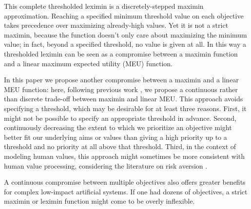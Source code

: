 This complete thresholded leximin is a discretely-stepped maximin approximation. Reaching a specified minimum threshold value on each objective takes precedence over maximizing already-high values. Yet it is not a strict maximin, because the function doesn't only care about maximizing the minimum value; in fact, beyond a specified threshold, no value is given at all. In this way a thresholded leximin can be seen as a compromise between a maximin function and a linear maximum expected utility (MEU) function.

In this paper we propose another compromise between a maximin and a linear MEU function: here, following previous work \cite{rolf_need_2020}, we propose a continuous rather than discrete trade-off between maximin and linear MEU. This approach avoids specifying a threshold, which may be desirable for at least three reasons. First, it might not be possible to specify an appropriate threshold in advance. Second, continuously decreasing the extent to which we prioritize an objective might better fit our underlying aims or values than giving a high priority up to a threshold and no priority at all above that threshold. %
Third, in the context of modeling human values, this approach might sometimes be more consistent with human value processing\cite{Tom515}, considering the literature on risk aversion \cite{pratt1978risk}.

A continuous compromise between multiple objectives also offers greater benefits for complex low-impact artificial systems. If one had dozens of objectives, a strict maximin or leximin function might come to be overly inflexible. 
